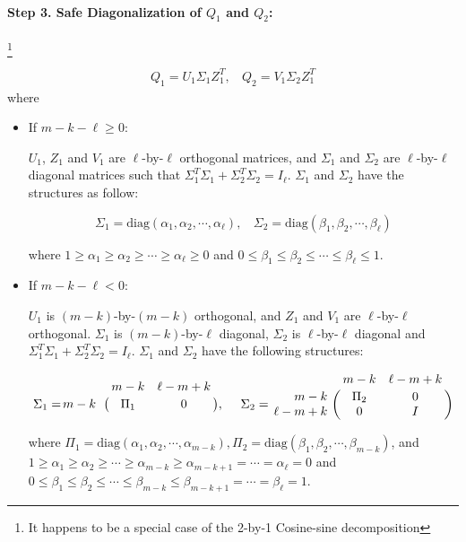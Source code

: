 \paragraph{Step 3. Safe Diagonalization of $Q_1$ and $Q_2$:} \footnote{It happens to be a special case of the 2-by-1 Cosine-sine decomposition}

\begin{align} \label{eq-alg-3}
Q_1 = U_1\Sigma_{1}Z_1^{T}, \ \ \ \ 
Q_2 = V_1\Sigma_{2}Z_1^{T}
\end{align}
where
\begin{itemize}
\item If $m-k-\ell \geq 0$:

$U_{1}$, $Z_{1}$ and $V_{1}$ are $\ell$-by-$\ell$ orthogonal
matrices, and $\Sigma_{1}$ and $\Sigma_{2}$ are $\ell$-by-$\ell$ diagonal matrices such that $\Sigma_{1}^{T}\Sigma_{1} + \Sigma_{2}^{T}\Sigma_{2} = I_{\ell}$. $\Sigma_{1}$ and $\Sigma_{2}$ have the structures as follow:

\[
	\Sigma_{1} = \mbox{diag}(\alpha_{1}, \alpha_{2}, \cdots, \alpha_{\ell}), \  \ \ \
    \Sigma_{2} = \mbox{diag}(\beta_{1}, \beta_{2}, \cdots, \beta_{\ell})\]

where $1 \geq \alpha_{1} \geq \alpha_{2} \geq \cdots \geq \alpha_{\ell} \geq 0$ and $0 \leq \beta_{1} \leq \beta_{2} \leq \cdots \leq \beta_{\ell} \leq 1$.

\item If $m-k-\ell < 0$:

$U_{1}$ is $(m-k)$-by-$(m-k)$ orthogonal, and 
$Z_{1}$ and $V_{1}$ are $\ell$-by-$\ell$ orthogonal. 
$\Sigma_{1}$ is $(m-k)$-by-$\ell$ diagonal, 
$\Sigma_{2}$ is $\ell$-by-$\ell$ diagonal 
and $\Sigma_{1}^{T}\Sigma_{1} + \Sigma_{2}^{T}\Sigma_{2} = I_{\ell}$. $\Sigma_{1}$ and $\Sigma_{2}$ have the following structures:

\[
	\Sigma_{1} = \bordermatrix{ & m-k & \ell-m+k \cr
    	\hfill m-k & \Pi_{1} & 0 }, \  \ \ \
    \Sigma_{2} = \bordermatrix{ & m-k & \ell-m+k   \cr
    	\hfill m-k & \Pi_{2} & 0\cr
        \hfill \ell-m+k & 0 & I}
\]

where $\Pi_{1} = \mbox{diag}(\alpha_{1}, \alpha_{2}, \cdots, \alpha_{m-k}), \Pi_{2} = \mbox{diag}(\beta_{1}, \beta_{2}, \cdots, \beta_{m-k})$, and $1 \geq \alpha_{1} \geq \alpha_{2} \geq \cdots \geq \alpha_{m-k} \geq \alpha_{m-k+1} = \cdots = \alpha_{\ell} = 0$ and $0 \leq \beta_{1} \leq \beta_{2} \leq \cdots \leq \beta_{m-k} \leq \beta_{m-k+1} = \cdots = \beta_{\ell} = 1$.

\end{itemize}

